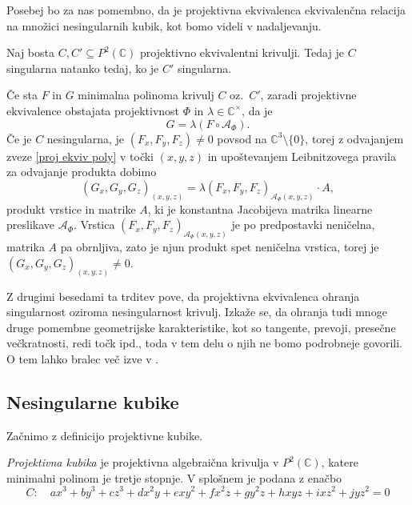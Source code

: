 \documentclass[mat1]{fmfdelo}
\numberwithin{equation}{section}
\newcommand{\C}{\mathbb C}
\newcommand{\CM}{\mathbb C ^\times}
\newcommand{\PC}{P^2(\mathbb C)}
\theoremstyle{definition}
\begin{document}
Posebej bo za nas pomembno, da je projektivna ekvivalenca ekvivalenčna relacija na množici nesingularnih kubik, kot bomo videli v nadaljevanju. 

\begin{trditev}
    Naj bosta $C, C' \subseteq \PC$ projektivno ekvivalentni krivulji. Tedaj je $C$ singularna natanko tedaj, ko je $C'$ singularna. 
\end{trditev}

\begin{dokaz}
    Če sta $F$ in $G$ minimalna polinoma krivulj $C$ oz.\ $C'$, zaradi projektivne ekvivalence obstajata projektivnost $\Phi$ in $\lambda \in \CM$, da je
    \begin{equation}
        \label{proj ekviv poly}
        G = \lambda (F \circ \mathcal{A}_\Phi).
    \end{equation}
    Če je $C$ nesingularna, je $(F_x, F_y, F_z) \neq 0$ povsod na $\C^3\setminus\{0\}$, torej z odvajanjem zveze \ref{proj ekviv poly} v točki $(x,y,z)$ in upoštevanjem Leibnitzovega pravila za odvajanje produkta dobimo
    \[
        (G_x, G_y, G_z)_{(x,y,z)} = \lambda (F_x, F_y, F_z)_{\mathcal{A}_\Phi (x,y,z)} \cdot A,
    \]
    produkt vrstice in matrike $A$, ki je konstantna Jacobijeva matrika linearne preslikave $\mathcal{A}_\Phi$. Vrstica $(F_x, F_y, F_z)_{\mathcal{A}_\Phi (x,y,z)}$ je po predpostavki neničelna, matrika $A$ pa obrnljiva, zato je njun produkt spet neničelna vrstica, torej je $(G_x, G_y, G_z)_{(x,y,z)} \neq 0$. 
\end{dokaz}

Z drugimi besedami ta trditev pove, da projektivna ekvivalenca ohranja singularnost oziroma nesingularnost krivulj. Izkaže se, da ohranja tudi mnoge druge pomembne geometrijske karakteristike, kot so tangente, prevoji, presečne večkratnosti, redi točk ipd., toda v tem delu o njih ne bomo podrobneje govorili. O tem lahko bralec več izve v \cite{Gibson}.



\subsection{Nesingularne kubike}\label{nesingularne kubike}
Začnimo z definicijo projektivne kubike. 

\begin{definicija}
    \emph{Projektivna kubika} je projektivna algebraična krivulja v $\PC$, katere minimalni polinom je tretje stopnje. 
    V splošnem je podana z enačbo
    \[
        C: \quad ax^3 + by^3 + cz^3 + dx^2y + exy^2 + fx^2z + gy^2z + hxyz + ixz^2 + jyz^2 = 0
    \]
\end{definicija}
\end{document}

